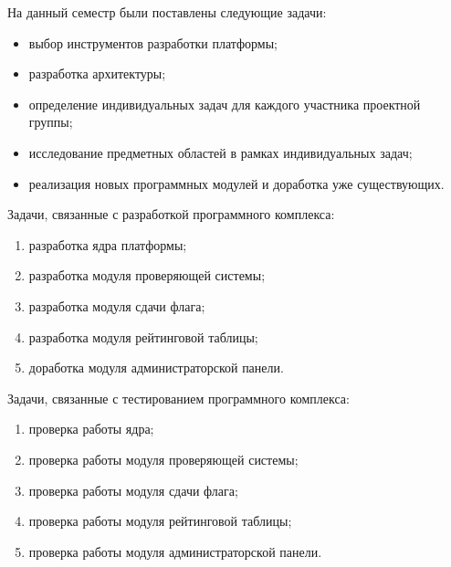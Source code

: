 На данный семестр были поставлены следующие задачи:

\begin{itemize}
\item выбор инструментов разработки платформы;
\item разработка архитектуры;
\item определение индивидуальных задач для каждого участника проектной группы;
\item исследование предметных областей в рамках индивидуальных задач;
\item реализация новых программных модулей и доработка уже существующих.
\end{itemize}

Задачи, связанные с разработкой программного комплекса:

\begin{enumerate}
\item разработка ядра платформы;
\item разработка модуля проверяющей системы;
\item разработка модуля сдачи флага;
\item разработка модуля рейтинговой таблицы;
\item доработка модуля администраторской панели.
\end{enumerate}

Задачи, связанные с тестированием программного комплекса:

\begin{enumerate}
\item проверка работы ядра;
\item проверка работы модуля проверяющей системы;
\item проверка работы модуля сдачи флага;
\item проверка работы модуля рейтинговой таблицы;
\item проверка работы модуля администраторской панели.
\end{enumerate}
